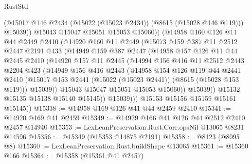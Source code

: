\begin{lexlean}{RustStd}
\begin{coremodule}
                    (@15017 @146 @2434 (@15022 (@15023 @2434)) (@8615 (@15028 @146 @119)))
                    @15039))
                @15043
                @15047
                @15051
                @15053
                @15060))
            (@14958
              @160
              @126
              @11
              @44
              @2449
              @2410
              (@14920
                @160
                @11
                @2449
                (@15073
                  @159
                  @387
                  @11
                  @2512
                  @2447
                  @2191
                  @433
                  (@14949
                    @159
                    @387
                    @2447
                    (@14958
                      @157
                      @126
                      @11
                      @44
                      @2445
                      @2410
                      (@14920
                        @157
                        @11
                        @2445
                        (@14994
                          @156
                          @416
                          @11
                          @2512
                          @2443
                          @2204
                          @423
                          (@14949
                            @156
                            @416
                            @2443
                            (@14958
                              @154
                              @126
                              @119
                              @44
                              @2441
                              @2410
                              (@15017 @153 @2441 (@15022 (@15023 @2441)) (@8615 (@15028 @153 @119)))
                              @15039))
                          @15043
                          @15047
                          @15051
                          @15053
                          @15060))
                      @15039))
                  @15132
                  @15135
                  @15138
                  @15140
                  @15145))
              @15039)))
        @15153
        @15156
        @15159
        @15161
        @15145))
@15338 := @14958 @169 @126 @41 @44 @2459 @2410
@15341 := @14920 @169 @41 @2459
@15349 := @14929 @166 @41 @126 @44 @2512 @2410 @2457 @14940
@15353 := LexLeanPreservation.Rust.Corr.opsNil @13065 @8231 @14596
@15356 := @15349 (@15353 @14875 @2191)
@15358 := @8123 (@8095 @8)
@15360 := LexLeanPreservation.Rust.buildShape @13065
@15361 := @15360 @166
@15364 := @15358 (@15361 @41 @2457)

\end{coremodule}
\end{lexlean}
